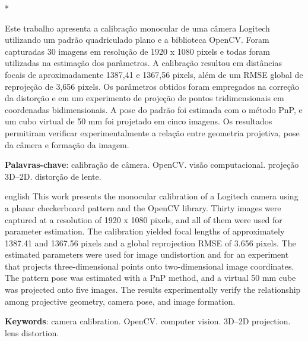 \documentclass[12pt, a4paper, twoside, chapter=TITLE, subsection=TITLE, section=TITLE, subsubsection=TITLE, subsubsubsection=TITLE, english, german, brazil]{abntex2}
\begin{document}
\pretextual
\imprimircapa
\imprimirfolhaderosto[]*
\makeatother\cleardoublepage

\begin{resumo}[Resumo]
Este trabalho apresenta a calibração monocular de uma câmera Logitech utilizando um padrão quadriculado plano e a biblioteca OpenCV. Foram capturadas 30 imagens em resolução de 1920 x 1080 pixels e todas foram utilizadas na estimação dos parâmetros. A calibração resultou em distâncias focais de aproximadamente 1387,41 e 1367,56 pixels, além de um RMSE global de reprojeção de 3,656 pixels. Os parâmetros obtidos foram empregados na correção da distorção e em um experimento de projeção de pontos tridimensionais em coordenadas bidimensionais. A pose do padrão foi estimada com o método PnP, e um cubo virtual de 50 mm foi projetado em cinco imagens. Os resultados permitiram verificar experimentalmente a relação entre geometria projetiva, pose da câmera e formação da imagem.

\vspace{\onelineskip}
\noindent
\textbf{Palavras-chave}: calibração de câmera. OpenCV. visão computacional. projeção 3D--2D. distorção de lente.
\end{resumo}

\begin{resumo}[Abstract]
\begin{otherlanguage*}{english}
This work presents the monocular calibration of a Logitech camera using a planar checkerboard pattern and the OpenCV library. Thirty images were captured at a resolution of 1920 x 1080 pixels, and all of them were used for parameter estimation. The calibration yielded focal lengths of approximately 1387.41 and 1367.56 pixels and a global reprojection RMSE of 3.656 pixels. The estimated parameters were used for image undistortion and for an experiment that projects three-dimensional points onto two-dimensional image coordinates. The pattern pose was estimated with a PnP method, and a virtual 50 mm cube was projected onto five images. The results experimentally verify the relationship among projective geometry, camera pose, and image formation.

\vspace{\onelineskip}
\noindent
\textbf{Keywords}: camera calibration. OpenCV. computer vision. 3D--2D projection. lens distortion.
\end{otherlanguage*}
\end{resumo}

\tableofcontents*
\cleardoublepage
\end{document}
